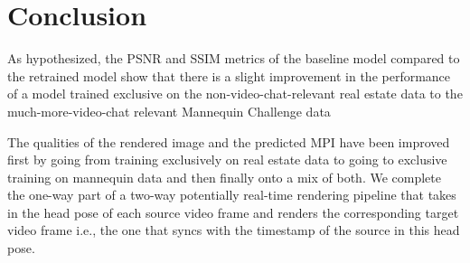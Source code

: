 \chapter{Conclusion}\label{ch:conclusion}

As hypothesized, the PSNR and SSIM metrics of the baseline model compared to the retrained model show that there is a slight improvement in the performance of a model trained exclusive on the non-video-chat-relevant real estate data to the much-more-video-chat relevant Mannequin Challenge data 

The qualities of the rendered image and the predicted MPI have been improved first by going from training exclusively on real estate data to going to exclusive training on mannequin data and then finally onto a mix of both. We complete the one-way part of a two-way potentially real-time rendering pipeline that takes in the head pose of each source video frame and renders the corresponding target video frame i.e., the one that syncs with the timestamp of the source in this head pose.   


% 